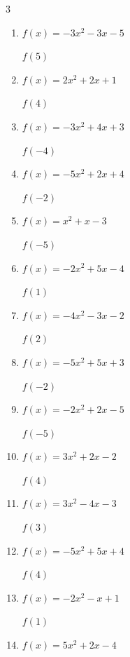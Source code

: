 \begin{multicols}{3}
\begin{enumerate}
$f(3)$
        \phantom{$= -25$}

  \item $f(x)=-3x^{2}-3x-5$

$f(5)$
        \phantom{$= -95$}

  \item $f(x)=2x^{2}+2x+1$

$f(4)$
        \phantom{$= 41$}

  \item $f(x)=-3x^{2}+4x+3$

$f(-4)$
        \phantom{$= -61$}

\columnbreak %

  \item $f(x)=-5x^{2}+2x+4$

$f(-2)$
        \phantom{$= -20$}

  \item $f(x)=x^{2}+x-3$

$f(-5)$
        \phantom{$= 17$}

  \item $f(x)=-2x^{2}+5x-4$

$f(1)$
        \phantom{$= -1$}

  \item $f(x)=-4x^{2}-3x-2$

$f(2)$
        \phantom{$= -24$}

  \item $f(x)=-5x^{2}+5x+3$

$f(-2)$
        \phantom{$= -27$}

  \item $f(x)=-2x^{2}+2x-5$

$f(-5)$
        \phantom{$= -65$}

  \item $f(x)=3x^{2}+2x-2$

$f(4)$
        \phantom{$= 54$}

  \item $f(x)=3x^{2}-4x-3$

$f(3)$
        \phantom{$= 12$}

  \item $f(x)=-5x^{2}+5x+4$

$f(4)$
        \phantom{$= -56$}

  \item $f(x)=-2x^{2}-x+1$

$f(1)$
        \phantom{$= -2$}

  \item $f(x)=5x^{2}+2x-4$


\end{enumerate}
\end{multicols}
